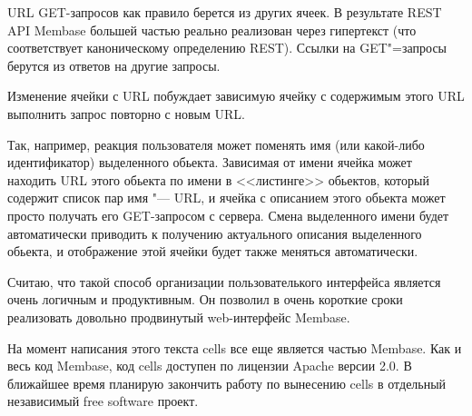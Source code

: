 \documentclass[10pt, a5paper]{article}
\begin{document}
URL GET-запросов как правило берется из других ячеек. В результате
REST API Membase большей частью реально реализован через гипертекст
(что соответствует каноническому определению REST). Ссылки на GET"=запросы 
берутся из ответов на другие запросы.

Изменение ячейки с URL побуждает зависимую ячейку с содержимым этого
URL выполнить запрос повторно с новым URL.

Так, например, реакция пользователя может поменять имя (или какой-либо
идентификатор) выделенного обьекта. Зависимая от \linebreak имени ячейка может
находить URL этого обьекта по имени в <<листинге>> обьектов, который
содержит список пар имя "--- URL, и ячейка с описанием этого обьекта может
просто получать его GET-запросом с сервера. Смена выделенного имени
будет автоматически приводить к получению актуального описания
выделенного обьекта, и отображение этой ячейки будет также меняться
автоматически.

Считаю, что такой способ организации пользователького интерфейса
является очень логичным и продуктивным.  Он позволил в очень
короткие сроки реализовать довольно продвинутый web-интерфейс Membase.

На момент написания этого текста cells все еще является частью
Membase. Как и весь код Membase, код cells доступен по лицензии Apache
версии 2.0. В ближайшее время планирую закончить работу по вынесению
cells в отдельный независимый free software проект.
\end{document}
